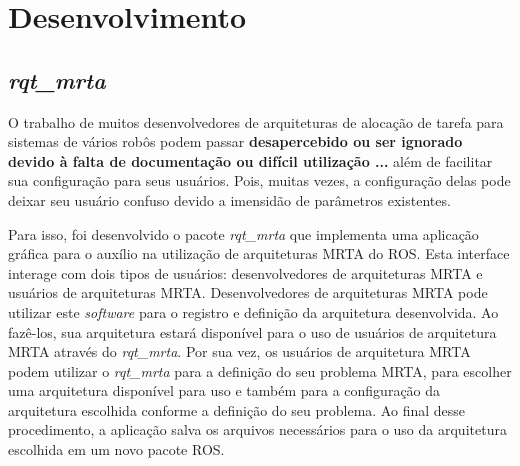 \chapter[Desenvolvimento]{Desenvolvimento} \label{cap:desenvolvimento}
    
    
    \section{\textit{rqt\_mrta}}
        O trabalho de muitos desenvolvedores de arquiteturas de alocação de tarefa para sistemas de vários robôs podem passar \textbf{\color{red}desapercebido ou ser ignorado devido à falta de documentação ou difícil utilização ...} além de facilitar sua configuração para seus usuários. Pois, muitas vezes, a configuração delas pode deixar seu usuário confuso devido a imensidão de parâmetros existentes.
        
        Para isso, foi desenvolvido o pacote \textit{rqt\_mrta} que implementa uma aplicação gráfica para o auxílio na utilização de arquiteturas MRTA do ROS. Esta interface interage com dois tipos de usuários: desenvolvedores de arquiteturas MRTA e usuários de arquiteturas MRTA. Desenvolvedores de arquiteturas MRTA pode utilizar este \textit{software} para o registro e definição da arquitetura desenvolvida. Ao fazê-los, sua arquitetura estará disponível para o uso de usuários de arquitetura MRTA através do \textit{rqt\_mrta}. Por sua vez, os usuários de arquitetura MRTA podem utilizar o \textit{rqt\_mrta} para a definição do seu problema MRTA, para escolher uma arquitetura disponível para uso e também para a configuração da arquitetura escolhida conforme a definição do seu problema. Ao final desse procedimento, a aplicação salva os arquivos necessários para o uso da arquitetura escolhida em um novo pacote ROS.
        

